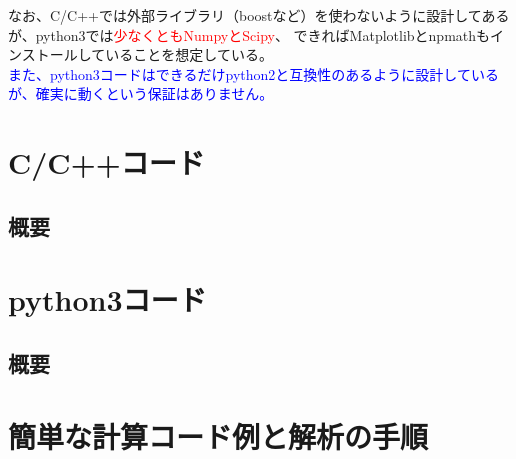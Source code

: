 \documentclass[12pt, a4paper]{jsarticle}
\begin{document}
なお、C/C++では外部ライブラリ（boostなど）を使わないように設計してあるが、python3では\textcolor{red}{少なくともNumpyとScipy}、
できればMatplotlibとnpmathもインストールしていることを想定している。\\

\textcolor{blue}{また、python3コードはできるだけpython2と互換性のあるように設計しているが、確実に動くという保証はありません。}
\section{C/C++コード}
\subsection{概要}
\section{python3コード}
\subsection{概要}
\section{簡単な計算コード例と解析の手順}
\end{document}
